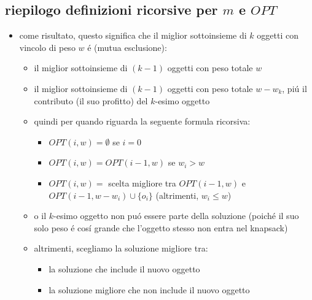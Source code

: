 \subsection*{riepilogo definizioni ricorsive per $m$ e $OPT$}
\begin{flushleft}
	\begin{itemize}
		\item come risultato, questo significa che il miglior sottoinsieme di $k$ oggetti con vincolo di peso $w$ \'e (mutua esclusione):
		\begin{itemize}
			\item il miglior sottoinsieme di $(k-1)$ oggetti con peso totale $w$
			\item il miglior sottoinsieme di $(k-1)$ oggetti con peso totale $w-w_k$, pi\'u il contributo (il suo profitto) del $k$-esimo oggetto
			\item quindi per quando riguarda la seguente formula ricorsiva:
			\begin{itemize}
				\item $OPT(i,w)=\emptyset$ se $i=0$
				\item $OPT(i,w)=OPT(i-1,w)$ se $w_i>w$
				\item $OPT(i,w)=$ scelta migliore tra $OPT(i-1,w)$ e $OPT(i-1,w-w_i)\cup\{o_i\}$ (altrimenti, $w_i\leq w$)
			\end{itemize}
		\item o il $k$-esimo oggetto non pu\'o essere parte della soluzione (poich\'e il suo solo peso \'e cos\'i grande che l'oggetto stesso non entra nel knapsack)
		\item altrimenti, scegliamo la soluzione migliore tra:
		\begin{itemize}
			\item la soluzione che include il nuovo oggetto
			\item la soluzione migliore che non include il nuovo oggetto
		\end{itemize}
		\end{itemize}
	\end{itemize}
\end{flushleft}


